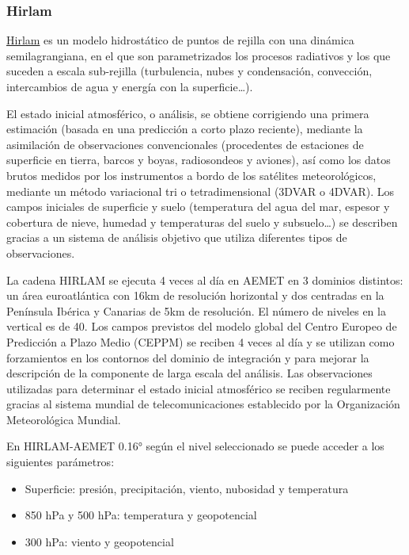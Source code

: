 \documentclass[11pt]{article}
\begin{document}
\subsubsection{Hirlam}
\label{sec-2-5-1}
\href{http://www.aemet.es/es/eltiempo/prediccion/modelosnumericos/hirlam}{Hirlam} es un modelo hidrostático de puntos de rejilla con una
dinámica semilagrangiana, en el que son parametrizados los
procesos radiativos y los que suceden a escala sub-rejilla
(turbulencia, nubes y condensación, convección, intercambios de
agua y energía con la superficie…).

El estado inicial atmosférico, o análisis, se obtiene corrigiendo
una primera estimación (basada en una predicción a corto plazo
reciente), mediante la asimilación de observaciones convencionales
(procedentes de estaciones de superficie en tierra, barcos y
boyas, radiosondeos y aviones), así como los datos brutos medidos
por los instrumentos a bordo de los satélites meteorológicos,
mediante un método variacional tri o tetradimensional (3DVAR o
4DVAR). Los campos iniciales de superficie y suelo (temperatura
del agua del mar, espesor y cobertura de nieve, humedad y
temperaturas del suelo y subsuelo…) se describen gracias a un
sistema de análisis objetivo que utiliza diferentes tipos de
observaciones.

La cadena HIRLAM se ejecuta 4 veces al día en AEMET en 3 dominios
distintos: un área euroatlántica con 16km de resolución horizontal
y dos centradas en la Península Ibérica y Canarias de 5km de
resolución. El número de niveles en la vertical es de 40. Los
campos previstos del modelo global del Centro Europeo de
Predicción a Plazo Medio (CEPPM) se reciben 4 veces al día y se
utilizan como forzamientos en los contornos del dominio de
integración y para mejorar la descripción de la componente de
larga escala del análisis. Las observaciones utilizadas para
determinar el estado inicial atmosférico se reciben regularmente
gracias al sistema mundial de telecomunicaciones establecido por
la Organización Meteorológica Mundial.

En HIRLAM-AEMET 0.16° según el nivel seleccionado se puede acceder
a los siguientes parámetros:
\begin{itemize}
\item Superficie: presión, precipitación, viento, nubosidad y temperatura
\item 850 hPa y 500 hPa: temperatura y geopotencial
\item 300 hPa: viento y geopotencial
\end{itemize}
\end{document}
